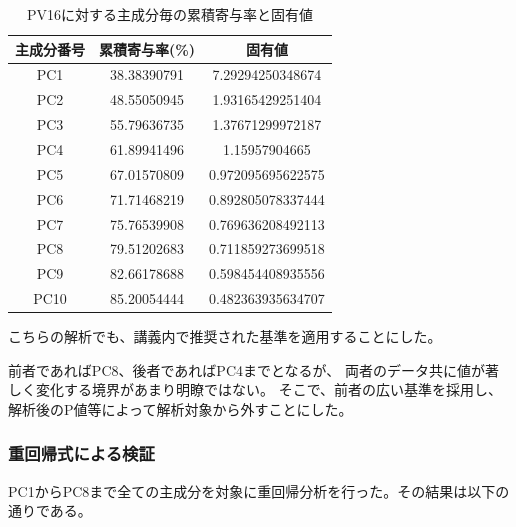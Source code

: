\documentclass[11pt,a4paper, uplatex]{jsarticle}
\begin{document}
\begin{table}[htbp]
  \begin{center}
    \caption{PV16に対する主成分毎の累積寄与率と固有値}
    \label{tb:pv16pcs}
    \begin{tabular}{c|c|c}
      \hline
      主成分番号 & 累積寄与率(\%) & 固有値 \\ \hline \hline
      PC1 & 38.38390791 & 7.29294250348674 \\
      PC2 & 48.55050945 & 1.93165429251404 \\
      PC3 & 55.79636735 & 1.37671299972187 \\
      PC4 & 61.89941496 & 1.15957904665 \\
      PC5 & 67.01570809 & 0.972095695622575 \\
      PC6 & 71.71468219 & 0.892805078337444 \\
      PC7 & 75.76539908 & 0.769636208492113 \\
      PC8 & 79.51202683 & 0.711859273699518 \\
      PC9 & 82.66178688 & 0.598454408935556 \\
      PC10 & 85.20054444 & 0.482363935634707 \\
      \hline
    \end{tabular}
  \end{center}
\end{table}

こちらの解析でも、講義内で推奨された基準を適用することにした。

前者であればPC8、後者であればPC4までとなるが、
両者のデータ共に値が著しく変化する境界があまり明瞭ではない。
そこで、前者の広い基準を採用し、解析後のP値等によって解析対象から外すことにした。

\subsubsection{重回帰式による検証}
PC1からPC8まで全ての主成分を対象に重回帰分析を行った。その結果は以下の通りである。
\end{document}
